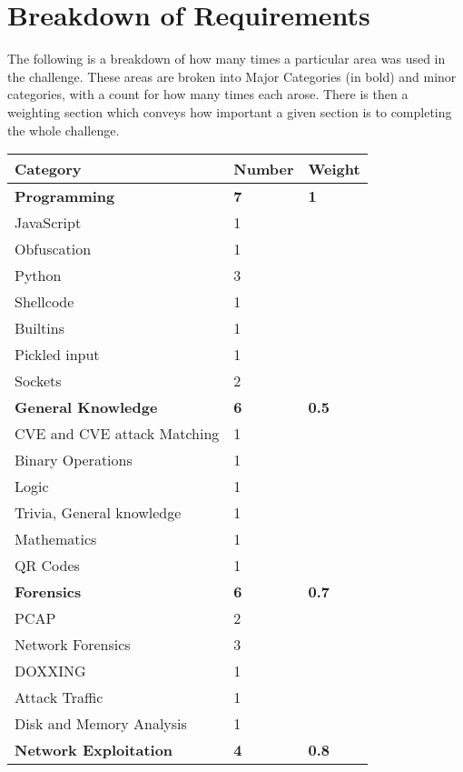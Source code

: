 \documentclass[a4paper,11pt]{report}
\begin{document}
	\section{Breakdown of Requirements}
	 	The following is a breakdown of how many times a particular area was used in the challenge. 
		These areas are broken into Major Categories (in bold) and minor categories, with a count for how many times each arose. 
		There is then a weighting section which conveys how important a given section is to completing the whole challenge. 
		\begin{table}[htb]
			\centering
			\begin{tabular}{| l | l | l |}
				\hline
				\textbf{Category} & \textbf{Number} & \textbf{Weight} \\ \hline 
				\textbf{Programming} & \textbf{7} & \textbf{1} \\ \hline
				\quad JavaScript & 1 & \\ \hline 
				\quad Obfuscation & 1 & \\ \hline
				\quad Python & 3 & \\ \hline 
				\qquad Shellcode & 1 & \\ \hline 
				\qquad Builtins & 1 & \\ \hline 
				\qquad Pickled input & 1 & \\ \hline 
				\quad Sockets & 2 & \\ \hline 
				\textbf{General Knowledge} & \textbf{6} & \textbf{0.5}\\ \hline 
				\quad CVE and CVE attack Matching & 1 & \\ \hline 
				\quad Binary Operations & 1 & \\ \hline 
				\quad Logic & 1 & \\ \hline 
				\quad Trivia, General knowledge & 1 & \\ \hline 
				\quad Mathematics & 1 & \\ \hline 
				\quad QR Codes & 1 & \\ \hline 
				\textbf{Forensics} & \textbf{6} & \textbf{0.7}\\ \hline
				\quad PCAP & 2 & \\ \hline
				\quad Network Forensics & 3 & \\ \hline 
				\quad DOXXING & 1 & \\ \hline 
				\quad Attack Traffic & 1 & \\ \hline 
				\quad Disk and Memory Analysis & 1 & \\ \hline 
				\textbf{Network Exploitation} & \textbf{4} & \textbf{0.8} \\ \hline 

\end{tabular}
\end{table}
\end{document}
